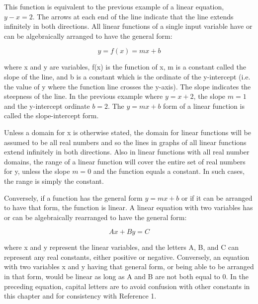 


This function is equivalent to the previous example of a linear equation, $y - x = 2$. The arrows at each end of the line indicate that the line extends infinitely in both directions. All linear functions of a single input variable have or can be algebraically arranged to have the general form:



$$ y = f(x) = mx + b $$



where x and y are variables, f(x) is the function of x, m is a constant called the slope of the line, and b is a constant which is the ordinate of the y-intercept (i.e. the value of y where the function line crosses the y-axis). The slope indicates the steepness of the line. In the previous example where $y = x + 2$, the slope $m = 1$ and the y-intercept ordinate $b = 2$. The $y = mx + b$ form of a linear function is called the slope-intercept form.



Unless a domain for x is otherwise stated, the domain for linear functions will be assumed to be all real numbers and so the lines in graphs of all linear functions extend infinitely in both directions. Also in linear functions with all real number domains, the range of a linear function will cover the entire set of real numbers for y, unless the slope $m = 0$ and the function equals a constant. In such cases, the range is simply the constant.



Conversely, if a function has the general form $y = mx + b$ or if it can be arranged to have that form, the function is linear. A linear equation with two variables has or can be algebraically rearranged to have the general form:



$$ A x + B y = C $$



where x and y represent the linear variables, and the letters A, B, and C can represent any real constants, either positive or negative. Conversely, an equation with two variables x and y having that general form, or being able to be arranged in that form, would be linear as long as A and B are not both equal to 0. In the preceding equation, capital letters are to avoid confusion with other constants in this chapter and for consistency with Reference 1.




